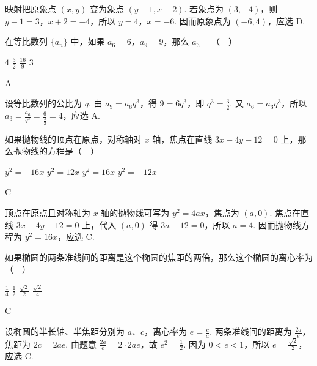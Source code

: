 \documentclass[UTF8,a4paper,oneside,11pt]{ctexbook}
\begin{document}
\begin{solution}
映射把原象点 \((x,y)\) 变为象点 \((y-1,x+2)\). 若象点为 \((3,-4)\)，则
\(y-1=3\)，\(x+2=-4\)，所以 \(y=4\)，\(x=-6\). 因而原象点为 \((-6,4)\)，应选 D.
\end{solution}

\begin{problem}
在等比数列 \(\{a_n\}\) 中，如果 \(a_6=6\)，\(a_9=9\)，那么 \(a_3=\)（\(\quad\)）

\choices
    {\(4\)}
    {\(\frac{3}{2}\)}
    {\(\frac{16}{9}\)}
    {\(3\)}
\end{problem}

\begin{answer}
A
\end{answer}

\begin{solution}
设等比数列的公比为 \(q\). 由 \(a_9=a_6q^3\)，得 \(9=6q^3\)，即 \(q^3=\frac32\). 又 \(a_6=a_3q^3\)，所以
\(a_3=\frac{a_6}{q^3}=\frac{6}{\frac{3}{2}}=4\)，应选 A.
\end{solution}

\begin{problem}
如果抛物线的顶点在原点，对称轴对 \(x\) 轴，焦点在直线 \(3x-4y-12=0\) 上，那么抛物线的方程是（\(\quad\)）

\choices
    {\(y^2=-16x\)}
    {\(y^2=12x\)}
    {\(y^2=16x\)}
    {\(y^2=-12x\)}
\end{problem}

\begin{answer}
C
\end{answer}

\begin{solution}
顶点在原点且对称轴为 \(x\) 轴的抛物线可写为 \(y^2=4ax\)，焦点为 \((a,0)\). 焦点在直线 \(3x-4y-12=0\) 上，代入 \((a,0)\) 得 \(3a-12=0\)，所以 \(a=4\). 因而抛物线方程为 \(y^2=16x\)，应选 C.
\end{solution}

\begin{problem}
如果椭圆的两条准线间的距离是这个椭圆的焦距的两倍，那么这个椭圆的离心率为（\(\quad\)）

\choices
    {\(\frac{1}{4}\)}
    {\(\frac{1}{2}\)}
    {\(\frac{\sqrt{2}}{2}\)}
    {\(\frac{\sqrt{2}}{4}\)}
\end{problem}

\begin{answer}
C
\end{answer}

\begin{solution}
设椭圆的半长轴、半焦距分别为 \(a\)、\(c\)，离心率为 \(e=\frac ca\). 两条准线间的距离为 \(\frac{2a}{e}\)，焦距为 \(2c=2ae\). 由题意
\(\frac{2a}{e}=2\cdot2ae\)，故 \(e^2=\frac12\). 因为 \(0<e<1\)，所以 \(e=\frac{\sqrt2}{2}\)，应选 C.
\end{solution}
\end{document}
